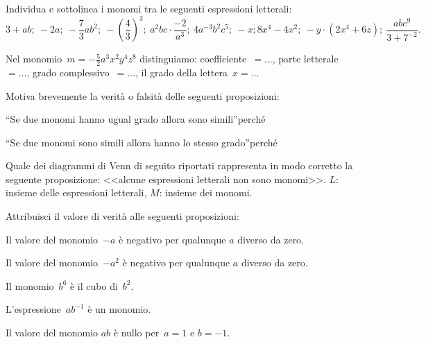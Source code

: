 \begin{esercizio}
 \label{ese:10.7} %
Individua e sottolinea i monomi tra le seguenti espressioni letterali:
\[3+ab;\:-2a;\:-\frac{7}{3}ab^2;\:-(\frac{4}{3})^{3};\:a^{2}bc\cdot{\frac{-2}{a^{3}}};\:4a^{-3}b^{2}c^{5};\:-x; 8x^{4}-4x^{2};\:-y\cdot(2x^{4}+6z);\:\frac{abc^{9}}{3+7^{-2}}.\]
\end{esercizio}

\begin{esercizio}
 \label{ese:10.8} %
Nel monomio~$m=-{\frac{5}{2}}a^{3}x^{2}y^{4}z^{8}$ distinguiamo: coefficiente~$=\ldots$,
parte letterale~$=\ldots$,
grado complessivo~$=\ldots$,
il grado della lettera~$x=\ldots$
\end{esercizio}

\begin{esercizio}
 \label{ese:10.9} %
Motiva brevemente la verità o falsità delle seguenti proposizioni:
\TabPositions{8.5cm}
\begin{enumeratea}
 \item ``Se due monomi hanno ugual grado allora sono simili''\tab\boxV\quad\boxF\qquad perché\dotfill
 \item ``Se due monomi sono simili allora hanno lo stesso grado''\tab\boxV\quad\boxF\qquad perché\dotfill
\end{enumeratea}
\end{esercizio}

\begin{esercizio}
 \label{ese:10.10} %
Quale dei diagrammi di Venn di seguito riportati rappresenta in modo corretto la seguente proposizione: <<alcune espressioni letterali non sono monomi>>.
$L$: insieme delle espressioni letterali, $M$: insieme dei monomi.
\begin{center}

\end{center}
\end{esercizio}

\begin{esercizio}
 \label{ese:10.11} %
 Attribuisci il valore di verità alle seguenti proposizioni:
\TabPositions{11.5cm}
\begin{enumeratea}
\item Il valore del monomio~$-a$ è negativo per qualunque $a$ diverso da zero.\tab\boxV\quad\boxF
\item Il valore del monomio~$-a^{2}$ è negativo per qualunque $a$ diverso da zero.\tab\boxV\quad\boxF
\item Il monomio~$b^{6}$ è il cubo di~$b^{2}$.\tab\boxV\quad\boxF
\item L'espressione~$ab^{-1}$ è un monomio.\tab\boxV\quad\boxF
\item Il valore del monomio $ab$ è nullo per~$a = 1$ e $b =-1$.\tab\boxV\quad\boxF
\end{enumeratea}
\end{esercizio}


